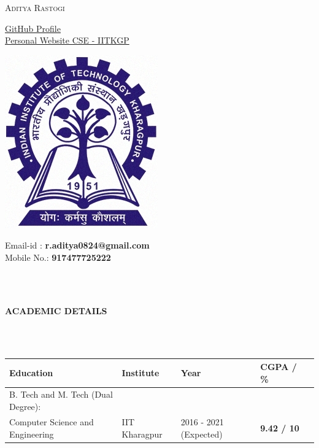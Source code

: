\documentclass[letter,10pt]{book}
\newcommand{\lsep}{-0.5cm}
\newcommand{\resheading}[1]{{\small \colorbox{mygrey}{\begin{minipage}{0.975\textwidth}{\textbf{#1 \vphantom{p\^{E}}}}\end{minipage}}}}
\begin{document}
\begin{center}
\textsc{\huge Aditya Rastogi}
\end{center}

\begin{minipage}{0.30\textwidth}
{\raggedleft
\href{https://github.com/thunderInfy/}{GitHub Profile} \\
\href{http://cse.iitkgp.ac.in/~arastogi}{Personal Website CSE - IITKGP}\\
}
\end{minipage}%
\begin{minipage}{0.33\textwidth}
\begin{center}
	\includegraphics[scale=0.1]{logo.jpg}
\end{center}
\end{minipage}%
\begin{minipage}{0.33\textwidth}
{\raggedright
Email-id : \textbf{r.aditya0824@gmail.com} \\
Mobile No.: \textbf{917477725222} \\
}
\end{minipage}%
\hspace{0.5cm}\\
\\
\resheading{\textbf{ACADEMIC DETAILS} }\\[\lsep]
\\
\begin{center}
\renewcommand{\arraystretch}{1.5}
\indent \begin{tabular}{ |@{\hskip 0.125in}l @{\hskip 0.125in} |@{\hskip 0.125in}l @{\hskip 0.125in} |@{\hskip 0.125in}l @{\hskip 0.125in} |@{\hskip 0.125in}l @{\hskip 0.25in} |l }
\hline
\textbf{Education} & \textbf{Institute} & \textbf{Year} & \textbf{CGPA / \%} \\
\hline
B. Tech and M. Tech (Dual Degree): &&&\\[-0.5em]
{Computer Science and Engineering} & IIT Kharagpur  & 2016 - 2021 (Expected) & \textbf{9.42 / 10} \\
\hline
\end{tabular}
\end{center}
\end{document}
